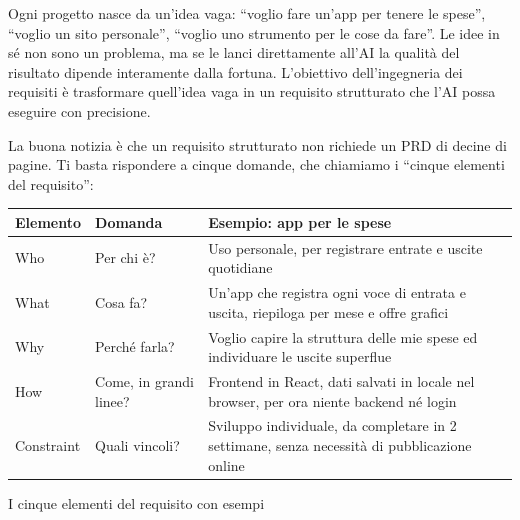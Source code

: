 


Ogni progetto nasce da un'idea vaga: “voglio fare un'app per tenere le spese”, “voglio un sito personale”, “voglio uno strumento per le cose da fare”. Le idee in sé non sono un problema, ma se le lanci direttamente all'AI la qualità del risultato dipende interamente dalla fortuna. L'obiettivo dell'ingegneria dei requisiti è trasformare quell'idea vaga in un requisito strutturato che l'AI possa eseguire con precisione.

La buona notizia è che un requisito strutturato non richiede un PRD di decine di pagine. Ti basta rispondere a cinque domande, che chiamiamo i “cinque elementi del requisito”:

\begin{center}
\begin{tabularx}{\linewidth}{|X|X|X|}
\hline
\textbf{Elemento} & \textbf{Domanda} & \textbf{Esempio: app per le spese} \tabularnewline
\hline
Who & Per chi è? & Uso personale, per registrare entrate e uscite quotidiane \tabularnewline
What & Cosa fa? & Un'app che registra ogni voce di entrata e uscita, riepiloga per mese e offre grafici \tabularnewline
Why & Perché farla? & Voglio capire la struttura delle mie spese ed individuare le uscite superflue \tabularnewline
How & Come, in grandi linee? & Frontend in React, dati salvati in locale nel browser, per ora niente backend né login \tabularnewline
Constraint & Quali vincoli? & Sviluppo individuale, da completare in 2 settimane, senza necessità di pubblicazione online \tabularnewline
\hline
\end{tabularx}
\end{center}

\begin{center}\small\color{gray}I cinque elementi del requisito con esempi\end{center}

